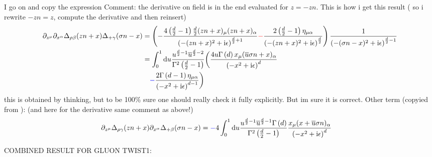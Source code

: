 I go on and copy the expression  Comment: the derivative on field is in the end evaluated for $z=-zn$. This is how i get this result ( so i rewrite $-zn = z$, compute the derivative and then reinsert)
\begin{align}
\partial_{z^\mu} \partial_{x^\alpha} \Delta_{\rho \beta}(zn+x) \Delta_{+ \gamma}(\sigma n -x)
&=
\left(-\frac{4 \left(\frac{d}{2}-1\right)\frac{d}{2}(zn+x)_\mu (zn+x)_\alpha}{\left(-(zn+x)^2 +\text{i} \epsilon\right)^{\frac{d}{2}+1}} {\color{red}-} \frac{2\left( \frac{d}{2}-1\right) \eta_{\mu \alpha} }{\left(-(zn+x)^2 +\text{i} \epsilon\right)^{\frac{d}{2}}}\right)\frac{1}{\left(-(\sigma n-x)^2 + \text{i} \epsilon\right)^{\frac{d}{2}-1}}
\\
&=
\int_{0}^{1} \text{d} u \frac{ u^{\frac{d}{2}-1} \overline u^{\frac{d}{2}-2} }{\Gamma^2\left( \frac{d}{2} -1 \right)}	\bigg(\frac{4 u \Gamma\left( d \right) x_\mu (\overline u\sigma n+x)_\alpha}{\left(-x^2 +\text{i} \epsilon\right)^{d}} 
\\&~~~
{\color{blue}-} \frac{2\Gamma\left( d-1 \right) \eta_{\mu \alpha} }{\left(-x^2+\text{i} \epsilon\right)^{d-1}}\bigg)
\end{align} 
this is obtained by thinking, but to be 100\% sure one should really check it fully explicitly. But im sure it is correct.
Other term (copyied from ): (and here for the derivative same comment as above!)
\begin{align}
\partial_{z^\mu}  \Delta_{\rho \gamma}(zn+x) \partial_{x^\alpha}\Delta_{+ \beta}(\sigma n -x)
&=
{\color{blue}-}4\int_{0}^{1} \text{d} u \frac{u^{\frac{d}{2}-1} \overline u^{\frac{d}{2}-1}\Gamma\left( d \right)}{\Gamma^2\left( \frac{d}{2}-1 \right)}\frac{x_\mu(x + \overline u\sigma n)_\alpha}{\left(-x^2 + \text{i} \epsilon\right)^{d}}
\end{align}

COMBINED RESULT FOR GLUON TWIST1: 

\ifdefined\mainprogram{}
\else

\fi
